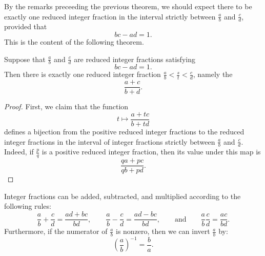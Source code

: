By the remarks preceeding the previous theorem, we should expect there to be exactly one reduced integer fraction in the interval strictly between $\frac{a}{b}$ and $\frac{c}{d}$, provided that
\begin{equation*}
  bc-ad=1.
\end{equation*}
This is the content of the following theorem.

\begin{theorem}
  Suppose that $\frac{a}{b}$ and $\frac{c}{d}$ are reduced integer fractions satisfying
  \begin{equation*}
    bc-ad=1.
  \end{equation*}
  Then there is exactly one reduced integer fraction $\frac{a}{b}<\frac{s}{t}<\frac{c}{d}$, namely the 
  \begin{equation*}
    \frac{a+c}{b+d}.
  \end{equation*}
\end{theorem}

\begin{proof}
  First, we claim that the function
  \begin{equation*}
    t\mapsto \frac{a+tc}{b+td}
  \end{equation*}
  defines a bijection from the positive reduced integer fractions to the reduced integer fractions in the interval of integer fractions strictly between $\frac{a}{b}$ and $\frac{c}{d}$. Indeed, if $\frac{p}{q}$ is a positive reduced integer fraction, then its value under this map is
  \begin{equation*}
    \frac{qa+pc}{qb+pd}.
  \end{equation*}
\end{proof}

\begin{definition}
  Integer fractions can be added, subtracted, and multiplied according to the following rules:
  \begin{equation*}
     \frac{a}{b}+\frac{c}{d} = \frac{ad+bc}{bd}, \qquad \frac{a}{b}-\frac{c}{d} = \frac{ad-bc}{bd}, \qquad\text{and}\qquad \frac{a}{b}\frac{c}{d} = \frac{ac}{bd}.
  \end{equation*}
  Furthermore, if the numerator of $\frac{a}{b}$ is nonzero, then we can invert $\frac{a}{b}$ by:
  \begin{equation*}
    \left(\frac{a}{b}\right)^{-1} = \frac{b}{a}.
  \end{equation*}
\end{definition}

